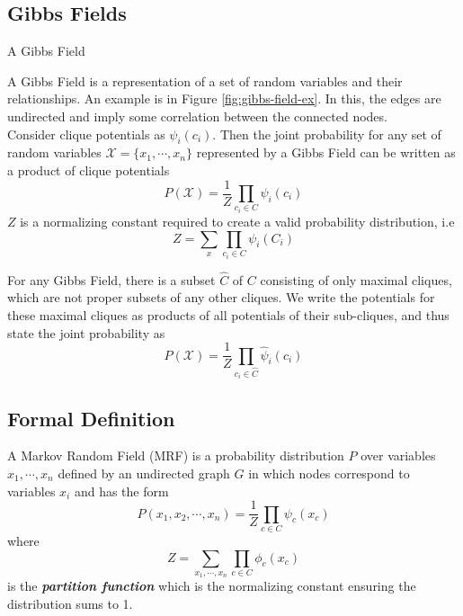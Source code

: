 \subsection{Gibbs Fields}
\begin{marginfigure}
\centering
{}
\caption{A Gibbs Field}
\label{fig:gibbs-field-ex}
\end{marginfigure}
A Gibbs Field is a representation of a set of random variables and their relationships. An example is in Figure \ref{fig:gibbs-field-ex}. In this, the edges are undirected and imply some correlation between the connected nodes. \\
Consider clique potentials as $\psi_i(c_i)$. Then the joint probability for any set of random variables $\mathcal{X} = \{x_1, \cdots, x_n\}$ represented by a Gibbs Field can be written as a product of clique potentials
\begin{equation}
P(\mathcal X) = \dfrac{1}{Z} \prod_{c_i \in C} \psi_i(c_i)
\end{equation}
$Z$ is a normalizing constant required to create a valid probability distribution, i.e
\begin{equation}
Z = \sum_x \prod_{c_i \in C}\psi_i(C_i)
\end{equation}
\begin{rem}
For any Gibbs Field, there is a subset $\hat{C}$ of $C$ consisting of only maximal cliques, which are not proper subsets of any other cliques. We write the potentials for these maximal cliques as products of all potentials of their sub-cliques, and thus state the joint probability as
\begin{equation}
	P(\mathcal X) = \dfrac{1}{Z}\prod_{c_i \in \hat C} \hat{\psi}_i(c_i)
\end{equation}
\end{rem}
\subsection{Formal Definition}
\begin{defn}
	A Markov Random Field (MRF) is a probability distribution $P$ over variables $x_1, \cdots, x_n$ defined by an undirected graph $G$ in which nodes correspond to variables $x_i$ and has the form
	\begin{equation}
		P(x_1, x_2, \cdots, x_n) = \dfrac{1}{Z}\prod_{c \in C} \psi_c(x_c)
	\end{equation}
	where 
	\begin{equation}
		Z = \sum_{x_1, \cdots, x_n}\prod_{c \in C} \phi_c (x_c)
	\end{equation}
	is the \textbf{\textit{partition function}} which is the normalizing constant ensuring the distribution sums to 1.
\end{defn}
